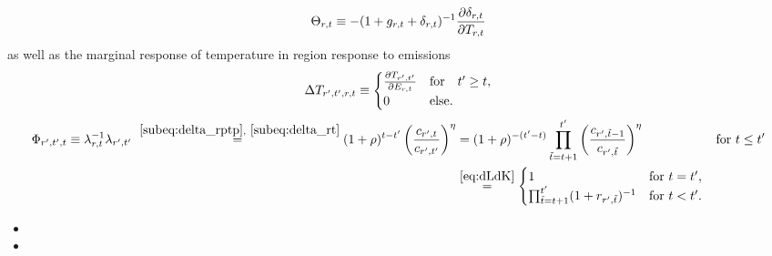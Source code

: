 \documentclass[preprint,3p,authoryear]{elsarticle}
\begin{document}
\begin{equation}
  \label{eq:Theta}
  \Theta_{r,t}\equiv - (1+g_{r,t}+\delta_{r,t})^{-1}\frac{\partial\delta_{r,t}}{\partial T_{r,t}}
\end{equation}
as well as the marginal response of temperature in region response to emissions
\begin{equation}
  \label{eq:DeltaT}
  \Delta T_{r',t',r,t}\equiv\begin{cases}
    \frac{\partial T_{r',t'}}{\partial E_{r,t}} & \text{for}\quad t'\geq t,\\
    0 & \text{else}    .
  \end{cases}
\end{equation}
\begin{align}
  \label{eq:Phi} \Phi_{r',t',t}\equiv\lambda_{r,t}^{-1}\lambda_{r',t'}\overset{~\eqref{subeq:delta_rptp},~\eqref{subeq:delta_rt}}{=}(1+\rho)^{t-t'}\left(\frac{c_{r',t}}{c_{r',t'}}\right)^{\eta}&\overset{}{=} (1+\rho)^{-(t'-t)}\prod_{\tilde{t}=t+1}^{t'}\left(\frac{c_{r',\tilde{t}-1}}{c_{r',\tilde{t}}}\right)^{\eta} &\text{for }t\leq t'\\
       &\overset{\eqref{eq:dLdK}}{=}
         \begin{cases}
           1 &\text{for }t=t',\\
           \prod_{\tilde{t}=t+1}^{t'}(1+r_{r',\tilde{t}})^{-1} & \text{for }t<t'.
           \end{cases}
\end{align}
\begin{itemize}
\item {}
\item {}
\end{itemize}
\end{document}
